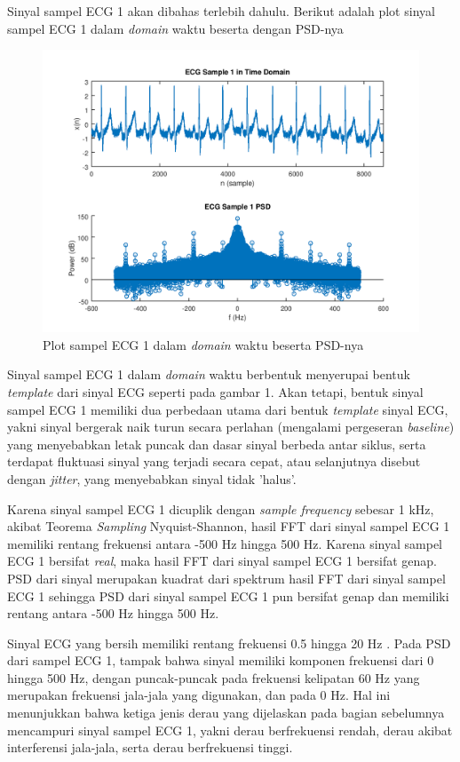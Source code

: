 \documentclass[11pt]{article}
\begin{document}
Sinyal sampel ECG 1 akan dibahas terlebih dahulu. Berikut adalah plot sinyal sampel ECG 1 dalam \textit{domain} waktu beserta dengan PSD-nya

\begin{figure}[H]
\centerline{\includegraphics[scale=0.7]{figures/fig5-ecg1timeandpsd.png}}
\caption{Plot sampel ECG 1 dalam \textit{domain} waktu beserta PSD-nya}
\end{figure}

Sinyal sampel ECG 1 dalam \textit{domain} waktu berbentuk menyerupai bentuk \textit{template} dari sinyal ECG seperti pada gambar 1. Akan tetapi, bentuk sinyal sampel ECG 1 memiliki dua perbedaan utama dari bentuk \textit{template} sinyal ECG, yakni sinyal bergerak naik turun secara perlahan (mengalami pergeseran \textit{baseline}) yang menyebabkan letak puncak dan dasar sinyal berbeda antar siklus, serta terdapat fluktuasi sinyal yang terjadi secara cepat, atau selanjutnya disebut dengan \textit{jitter}, yang menyebabkan sinyal tidak 'halus'.

Karena sinyal sampel ECG 1 dicuplik dengan \textit{sample frequency} sebesar 1 kHz, akibat Teorema \textit{Sampling} Nyquist-Shannon, hasil FFT dari sinyal sampel ECG 1 memiliki rentang frekuensi antara -500 Hz hingga 500 Hz. Karena sinyal sampel ECG 1 bersifat \textit{real}, maka hasil FFT dari sinyal sampel ECG 1 bersifat genap. PSD dari sinyal merupakan kuadrat dari spektrum hasil FFT dari sinyal sampel ECG 1 sehingga PSD dari sinyal sampel ECG 1 pun bersifat genap dan memiliki rentang antara -500 Hz hingga 500 Hz.

Sinyal ECG yang bersih memiliki rentang frekuensi 0.5 hingga 20 Hz \cite{thakor84}. Pada PSD dari sampel ECG 1, tampak bahwa sinyal memiliki komponen frekuensi dari 0 hingga 500 Hz, dengan puncak-puncak pada frekuensi kelipatan 60 Hz yang merupakan frekuensi jala-jala yang digunakan, dan pada 0 Hz. Hal ini menunjukkan bahwa ketiga jenis derau yang dijelaskan pada bagian sebelumnya mencampuri sinyal sampel ECG 1, yakni derau berfrekuensi rendah, derau akibat interferensi jala-jala, serta derau berfrekuensi tinggi.
\end{document}
